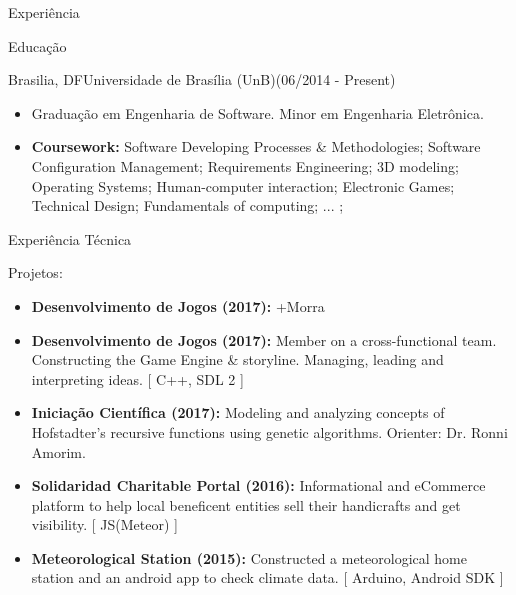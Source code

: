 \documentclass[]{fraguilarcv}
\begin{document}
\begin{cvsection}{Experiência}
	\begin{cvsection}{Educação}
		\begin{cvsubsection}{Brasilia, DF}{Universidade de Brasília (UnB)}{(06/2014 - Present)}
			\begin{itemize}
				\item Graduação em Engenharia de Software. Minor em Engenharia Eletrônica.
				\item \textbf{Coursework:} {Software Developing Processes \& Methodologies; Software Configuration Management;  Requirements Engineering; 3D modeling; Operating Systems; Human-computer interaction; Electronic Games; Technical Design; Fundamentals of computing; ... ;}
			\end{itemize}
		\end{cvsubsection}
	\end{cvsection}

	\begin{cvsection}{Experiência Técnica}
		\begin{cvsubsection}{Projetos:}{}{}
			\begin{itemize}
	    	\item \textbf{Desenvolvimento de Jogos (2017):} +Morra
				\item \textbf{Desenvolvimento de Jogos (2017):} Member on a cross-functional team. Constructing the Game Engine \& storyline. Managing, leading and interpreting ideas. [ C++, SDL 2 ]
				\item \textbf{Iniciação Científica (2017):} Modeling and analyzing concepts of Hofstadter's recursive functions using genetic algorithms. Orienter: Dr. Ronni Amorim.
	      \item \textbf{Solidaridad Charitable Portal (2016):} Informational and eCommerce platform to help local beneficent entities sell their handicrafts and get visibility. [ JS(Meteor) ]
	      \item \textbf{Meteorological Station (2015):} Constructed a meteorological home station and an android app to check climate data. [ Arduino, Android SDK ]
			\end{itemize}
		\end{cvsubsection}
	\end{cvsection}


\end{cvsection}
\end{document}
